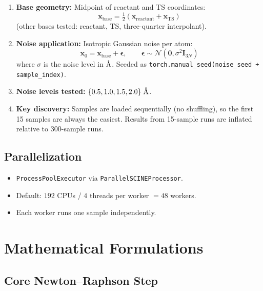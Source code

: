 \documentclass[11pt,a4paper]{article}
\newcommand{\vect}[1]{\mathbf{#1}}
\newcommand{\mat}[1]{\mathbf{#1}}
\newcommand{\angstrom}{\text{\r{A}}}
\begin{document}
\begin{enumerate}
  \item \textbf{Base geometry:} Midpoint of reactant and TS coordinates:
  \[
    \vect{x}_\text{base} = \tfrac{1}{2}(\vect{x}_\text{reactant} + \vect{x}_\text{TS})
  \]
  (other bases tested: reactant, TS, three-quarter interpolant).

  \item \textbf{Noise application:} Isotropic Gaussian noise per atom:
  \[
    \vect{x}_0 = \vect{x}_\text{base} + \vect{\epsilon}, \qquad \vect{\epsilon} \sim \mathcal{N}(\vect{0}, \sigma^2 \mat{I}_{3N})
  \]
  where $\sigma$ is the noise level in $\angstrom$. Seeded as \texttt{torch.manual\_seed(noise\_seed + sample\_index)}.

  \item \textbf{Noise levels tested:} $\{0.5, 1.0, 1.5, 2.0\}\;\angstrom$.

  \item \textbf{Key discovery:} Samples are loaded sequentially (no shuffling), so the first 15 samples are always the easiest. Results from 15-sample runs are inflated relative to 300-sample runs.
\end{enumerate}

\subsection{Parallelization}

\begin{itemize}
  \item \texttt{ProcessPoolExecutor} via \texttt{ParallelSCINEProcessor}.
  \item Default: $192$ CPUs / $4$ threads per worker $= 48$ workers.
  \item Each worker runs one sample independently.
\end{itemize}

\section{Mathematical Formulations}
\label{sec:math}

\subsection{Core Newton--Raphson Step}
\end{document}
